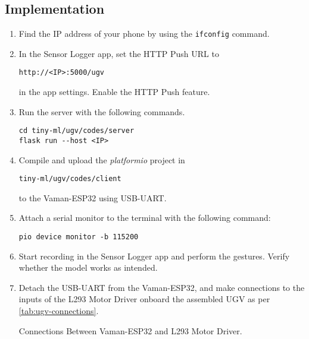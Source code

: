 \subsection{Implementation}
\begin{enumerate}
    \item Find the IP address of your phone by using the \texttt{ifconfig}
    command.
    \item In the Sensor Logger app, set the HTTP Push URL to
    \begin{lstlisting}
http://<IP>:5000/ugv
    \end{lstlisting}
    in the app settings. Enable the HTTP Push feature.
    \item Run the server with the following commands.
    \begin{lstlisting}
cd tiny-ml/ugv/codes/server
flask run --host <IP>
    \end{lstlisting}
    \item Compile and upload the \emph{platformio} project in 
    \begin{lstlisting}
tiny-ml/ugv/codes/client
    \end{lstlisting}
    to the Vaman-ESP32 using USB-UART.
    \item Attach a serial monitor to the terminal with the following command:
    \begin{lstlisting}
pio device monitor -b 115200
    \end{lstlisting}
    \item Start recording in the Sensor Logger app and perform the gestures.
    Verify whether the model works as intended.
    \item Detach the USB-UART from the Vaman-ESP32, and make connections
    to the inputs of the L293 Motor Driver onboard the assembled UGV as per
    \autoref{tab:ugv-connections}.
    \begin{table}[!ht]
        \centering
        
        \caption{Connections Between Vaman-ESP32 and L293 Motor Driver.}
        \label{tab:ugv-connections}
    \end{table} 
\end{enumerate}
